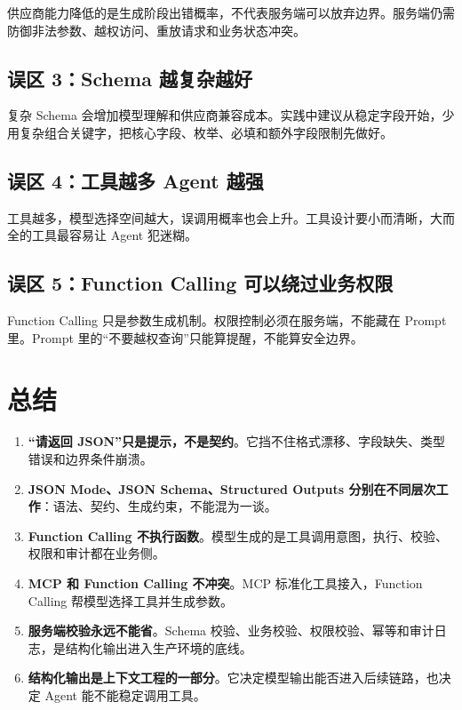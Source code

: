 \documentclass[9pt,a4paper,twocolumn]{ctexart}
\begin{document}
供应商能力降低的是生成阶段出错概率，不代表服务端可以放弃边界。服务端仍需防御非法参数、越权访问、重放请求和业务状态冲突。



\subsection*{误区 3：Schema 越复杂越好}


复杂 Schema 会增加模型理解和供应商兼容成本。实践中建议从稳定字段开始，少用复杂组合关键字，把核心字段、枚举、必填和额外字段限制先做好。



\subsection*{误区 4：工具越多 Agent 越强}


工具越多，模型选择空间越大，误调用概率也会上升。工具设计要小而清晰，大而全的工具最容易让 Agent 犯迷糊。



\subsection*{误区 5：Function Calling 可以绕过业务权限}


Function Calling 只是参数生成机制。权限控制必须在服务端，不能藏在 Prompt 里。Prompt 里的“不要越权查询”只能算提醒，不能算安全边界。



\section*{总结}

\begin{enumerate}[itemsep=1pt, topsep=2pt]
  \item \textbf{“请返回 JSON”只是提示，不是契约}。它挡不住格式漂移、字段缺失、类型错误和边界条件崩溃。
  \item \textbf{JSON Mode、JSON Schema、Structured Outputs 分别在不同层次工作}：语法、契约、生成约束，不能混为一谈。
  \item \textbf{Function Calling 不执行函数}。模型生成的是工具调用意图，执行、校验、权限和审计都在业务侧。
  \item \textbf{MCP 和 Function Calling 不冲突}。MCP 标准化工具接入，Function Calling 帮模型选择工具并生成参数。
  \item \textbf{服务端校验永远不能省}。Schema 校验、业务校验、权限校验、幂等和审计日志，是结构化输出进入生产环境的底线。
  \item \textbf{结构化输出是上下文工程的一部分}。它决定模型输出能否进入后续链路，也决定 Agent 能不能稳定调用工具。
\end{enumerate}
\end{document}
